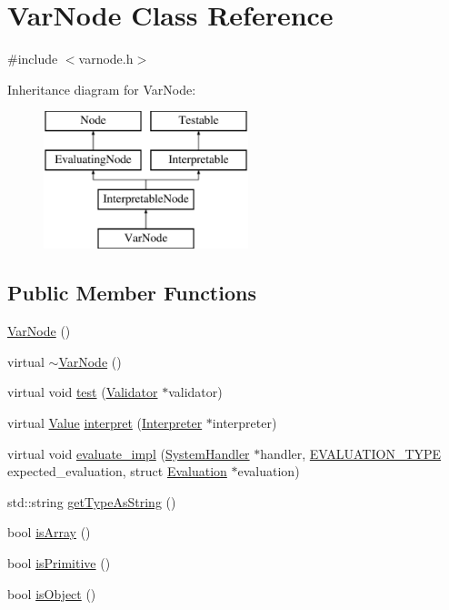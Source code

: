 \hypertarget{classVarNode}{}\section{Var\+Node Class Reference}
\label{classVarNode}


{\ttfamily \#include $<$varnode.\+h$>$}

Inheritance diagram for Var\+Node\+:\begin{figure}[H]
\begin{center}
\leavevmode
\includegraphics[height=4.000000cm]{classVarNode}
\end{center}
\end{figure}
\subsection*{Public Member Functions}
\begin{DoxyCompactItemize}
\item 
\hyperlink{classVarNode_a86b94143b89fc73a69cafb025415689f}{Var\+Node} ()
\item 
virtual \hyperlink{classVarNode_aab6e763704273c00cd756edbdd0b13df}{$\sim$\+Var\+Node} ()
\item 
virtual void \hyperlink{classVarNode_afaca674319775ae5e8a4fb0e5ec7b59f}{test} (\hyperlink{classValidator}{Validator} $\ast$validator)
\item 
virtual \hyperlink{classValue}{Value} \hyperlink{classVarNode_af2eed4fcade96d174c5b1f623b6bcdf6}{interpret} (\hyperlink{classInterpreter}{Interpreter} $\ast$interpreter)
\item 
virtual void \hyperlink{classVarNode_affe926e80803de0a83ce88f9a0d97db3}{evaluate\+\_\+impl} (\hyperlink{classSystemHandler}{System\+Handler} $\ast$handler, \hyperlink{statics_8h_a6664c451ca7787483a7981cc1de68dbb}{E\+V\+A\+L\+U\+A\+T\+I\+O\+N\+\_\+\+T\+Y\+PE} expected\+\_\+evaluation, struct \hyperlink{structEvaluation}{Evaluation} $\ast$evaluation)
\item 
std\+::string \hyperlink{classVarNode_afcde838758181438e89f8f91699c9d5b}{get\+Type\+As\+String} ()
\item 
bool \hyperlink{classVarNode_ab433d17cf3b2002756931a4f74cc200a}{is\+Array} ()
\item 
bool \hyperlink{classVarNode_a0a735a87c57b56a0fbcb87ef3dd36c3f}{is\+Primitive} ()
\item 
bool \hyperlink{classVarNode_ae0c6e834fe26f709f3e6bc859bc4384f}{is\+Object} ()
\end{DoxyCompactItemize}
